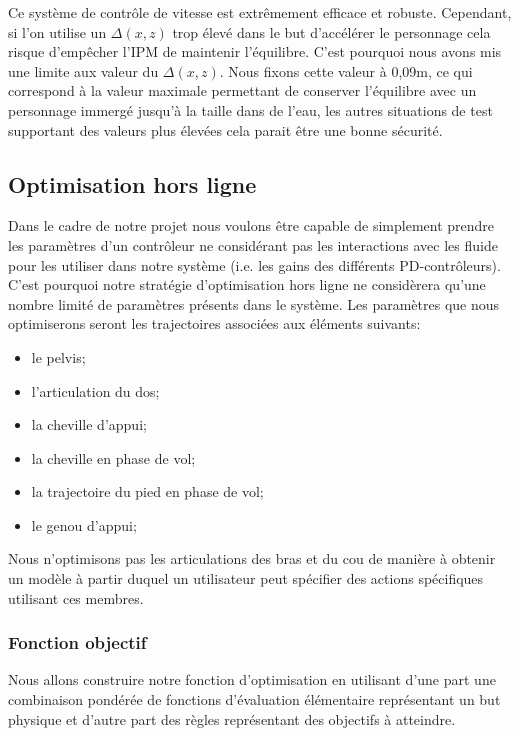 \documentclass{llncs}
\begin{document}
Ce système de contrôle de vitesse est extrêmement efficace et robuste. Cependant, si l'on utilise un $\Delta(x,z)$ trop élevé dans le but d'accélérer le personnage cela risque d'empêcher l'IPM de maintenir l'équilibre. C'est pourquoi nous avons mis une limite aux valeur du $\Delta(x,z)$. Nous fixons cette valeur à 0,09m, ce qui correspond à la valeur maximale permettant de conserver l'équilibre avec un personnage immergé jusqu'à la taille dans de l'eau, les autres situations de test supportant des valeurs plus élevées cela parait être une bonne sécurité. 
%

\subsection{Optimisation hors ligne}
%
Dans le cadre de notre projet nous voulons être capable de simplement prendre les paramètres d'un contrôleur ne considérant pas les interactions avec les fluide pour les utiliser dans notre système (i.e. les gains des différents PD-contrôleurs). C'est pourquoi notre stratégie d'optimisation hors ligne ne considèrera qu'une nombre limité de paramètres présents dans le système.
Les paramètres que nous optimiserons seront les trajectoires associées aux éléments suivants:
\begin{itemize}
\item{le pelvis;}
\item{l'articulation du dos;}
\item{la cheville d'appui;}
\item{la cheville en phase de vol;}
\item{la trajectoire du pied en phase de vol;}
\item{le genou d'appui;}
\end{itemize}
Nous n'optimisons pas les articulations des bras et du cou de manière à obtenir un modèle à partir duquel un utilisateur peut spécifier des actions spécifiques utilisant ces membres.

%
\subsubsection{Fonction objectif}
%
Nous allons construire notre fonction d'optimisation en utilisant d'une part une combinaison pondérée de fonctions d'évaluation élémentaire représentant un but physique et d'autre part des règles représentant des objectifs à atteindre.
\end{document}
